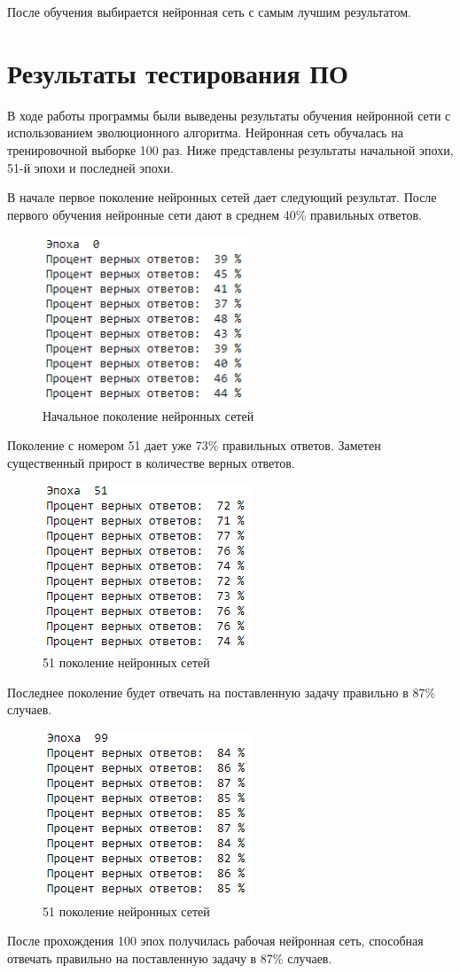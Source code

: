 После обучения выбирается нейронная сеть с самым лучшим результатом.

\section{Результаты тестирования ПО}

\indent \indent В ходе работы программы были выведены результаты обучения нейронной сети с использованием эволюционного алгоритма. Нейронная сеть обучалась на тренировочной выборке 100 раз. Ниже представлены результаты начальной эпохи, 51-й эпохи и последней эпохи.

В начале первое поколение нейронных сетей дает следующий результат. После первого обучения нейронные сети дают в среднем 40\% правильных ответов.

\begin{figure}[H]
  \centering
  \includegraphics[width=0.4\linewidth]{./img/first-epoch}
  \caption{Начальное поколение нейронных сетей}
  \label{fig:mpr} 
\end{figure}

Поколение с номером 51 дает уже 73\% правильных ответов. Заметен существенный прирост в количестве верных ответов.

\begin{figure}[H]
  \centering
  \includegraphics[width=0.4\linewidth]{./img/second-epoch}
  \caption{51 поколение нейронных сетей}
  \label{fig:mpr} 
\end{figure}

Последнее поколение будет отвечать на поставленную задачу правильно в 87\% случаев.

\begin{figure}[H]
  \centering
  \includegraphics[width=0.4\linewidth]{./img/third-epoch}
  \caption{51 поколение нейронных сетей}
  \label{fig:mpr} 
\end{figure}

После прохождения 100 эпох получилась рабочая нейронная сеть, способная отвечать правильно на поставленную задачу в 87\% случаев.